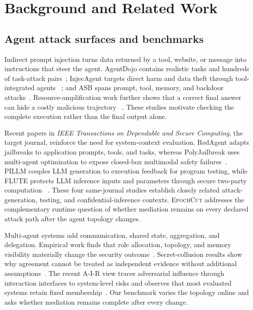 \documentclass[10pt,journal,compsoc]{IEEEtran}
\newcommand{\system}{\textsc{EpochCut}}
\begin{document}
\section{Background and Related Work}

\subsection{Agent attack surfaces and benchmarks}

Indirect prompt injection turns data returned by a tool, website, or message
into instructions that steer the agent.  AgentDojo contains realistic tasks
and hundreds of task-attack pairs~\cite{debenedetti2024agentdojo}; InjecAgent
targets direct harm and data theft through tool-integrated agents
~\cite{zhan2024injecagent}; and ASB spans prompt, tool, memory, and backdoor
attacks~\cite{zhang2025asb}.  Resource-amplification work further shows that a
correct final answer can hide a costly malicious trajectory
~\cite{zhou2026amplification}.  These studies motivate checking the complete
execution rather than the final output alone.

Recent papers in \emph{IEEE Transactions on Dependable and Secure Computing},
the target journal, reinforce the need for system-context evaluation.
RedAgent adapts jailbreaks to application prompts, tools, and tasks, whereas
PolyJailbreak uses multi-agent optimization to expose closed-box multimodal
safety failures~\cite{xu2026redagent,wang2026polyjailbreak}.  PILLM couples LLM
generation to execution feedback for program testing, while FLUTE protects LLM
inference inputs and parameters through secure two-party computation
~\cite{cao2025pillm,xue2026flute}.  These four same-journal studies establish
closely related attack-generation, testing, and confidential-inference
contexts.  \system{} addresses the complementary runtime question of whether
mediation remains on every declared attack path after the agent topology
changes.

Multi-agent systems add communication, shared state, aggregation, and
delegation.  Empirical work finds that role allocation, topology, and memory
visibility materially change the security outcome~\cite{hagag2026architecture}.
Secret-collusion results show why agreement cannot be treated as independent
evidence without additional assumptions~\cite{motwani2024collusion}.  The
recent A-I-R view traces adversarial influence through interaction interfaces
to system-level risks and observes that most evaluated systems retain fixed
membership~\cite{yang2026sok}.  Our benchmark varies the topology online and
asks whether mediation remains complete after every change.
\end{document}
